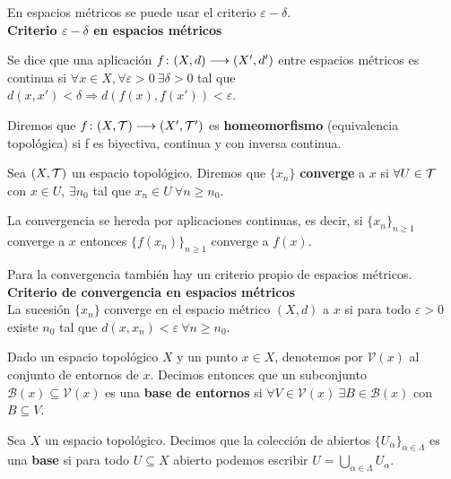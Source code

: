 \documentclass[GTS.tex]{subfiles}
\begin{document}
\vspace{0.5cm}

En espacios métricos se puede usar el criterio $\varepsilon-\delta$.\\
{\large \bf Criterio $\varepsilon-\delta$ en espacios métricos}

Se dice que una aplicación $f\colon{(X,d)}\longrightarrow{(X',d')}$ entre espacios métricos es continua si $\forall x\in X, \forall\varepsilon>0\ \exists\delta>0$ tal que $d(x,x')<\delta\Rightarrow d(f(x),f(x'))<\varepsilon$.

\vspace{0.5cm}

\begin{defi}Diremos que $f\colon{(X,\mathcal{T})}\longrightarrow{(X',\mathcal{T}')}$ es \textbf{homeomorfismo} (equivalencia topológica) si f es biyectiva, continua y con inversa continua.
\end{defi}

\begin{defi} Sea $(X,\mathcal{T})$ un espacio topológico. Diremos que $\{x_n\}$ \textbf{converge} a $x$ si $\forall U\in\mathcal{T}$ con $x\in U$, $\exists n_0$ tal que $x_n\in U\ \forall n\geq n_0$.
\end{defi}

La convergencia se hereda por aplicaciones continuas, es decir, si $\{x_n\}_{n\geq 1}$ converge a $x$ entonces $\{f(x_n)\}_{n\geq 1}$ converge a $f(x)$.

Para la convergencia también hay un criterio propio de espacios métricos.\\
{\large \bf Criterio de convergencia en espacios métricos}\\
La sucesión $\{x_n\}$ converge en el espacio métrico $(X,d)$ a $x$ si para todo $\varepsilon>0$ existe $n_0$ tal que $d(x,x_n)<\varepsilon\ \forall n\geq n_0$.

\begin{defi}
Dado un espacio topológico $X$ y un punto $x\in X$, denotemos por $\mathcal{V}(x)$ al conjunto de entornos de $x$. Decimos entonces que un subconjunto $\mathcal{B}(x)\subseteq\mathcal{V}(x)$ es una \textbf{base de entornos} si $\forall V\in\mathcal{V}(x)\ \exists B\in\mathcal{B}(x)$ con $B\subseteq V$. 
\end{defi}

\begin{defi} Sea $X$ un espacio topológico. Decimos que la colección de abiertos $\{U_\alpha\}_{\alpha\in\Lambda}$ es una \textbf{base} si para todo $U\subseteq X$ abierto podemos escribir $U=\bigcup_{\alpha\in\Lambda}U_\alpha$.
\end{defi}
\end{document}
